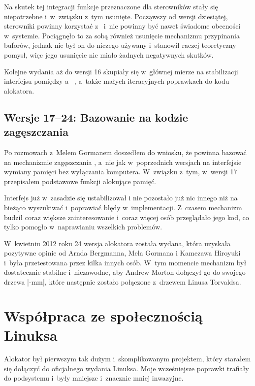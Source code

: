 Na skutek tej integracji funkcje  przeznaczone dla sterowników
stały się niepotrzebne i~w~związku z~tym usunięte.  Począwszy od
wersji dziesiątej, sterowniki powinny korzystać z~  i~nie
powinny być nawet świadome obecności  w~systemie.  Pociągnęło to za
sobą również usunięcie mechanizmu przypinania buforów, jednak nie był
on do niczego używany i~stanowił raczej teoretyczny pomysł, więc jego
usunięcie nie miało żadnych negatywnych skutków.

Kolejne wydania  aż do wersji 16 skupiały się w~głównej mierze na
stabilizacji interfejsu pomiędzy  a~ , a~także małych
iteracyjnych poprawkach do kodu alokatora.

\subsection{Wersje 17--24: Bazowanie na kodzie zagęszczania}

Po rozmowach z~Melem Gormanem doszedłem do wniosku, że  powinna
bazować na mechanizmie zagęszczania \autocite{bib:compaction,
  bib:supporting-large-contig-regions}, a~nie jak w~poprzednich
wersjach na interfejsie wymiany pamięci  bez wyłączania komputera.
W~związku z~tym, w~wersji 17 przepisałem podstawowe funkcji alokujące
pamięć.

Interfejs  już w~zasadzie się ustabilizował i nie pozostało już nic
innego niż na bieżąco wyszukiwać i~poprawiać błędy w~implementacji.
Z~czasem mechanizm  budził coraz większe zainteresowanie i~coraz
więcej osób przeglądało jego kod, co tylko pomogło w~naprawianiu
wszelkich problemów.

W~kwietniu 2012 roku 24 wersja alokatora  została wydana, która
uzyskała pozytywne opinie od Arnda Bergmanna, Mela Gormana i Kamezawa
Hiroyuki i~była przetestowana przez kilka innych osób.  W~tym momencie
mechanizm  był dostatecznie stabilne i~niezawodne, aby Andrew
Morton dołączył go do swojego drzewa \code|-mm|, które następnie
zostało połączone z~drzewem Linusa Torvaldsa.

\section{Współpraca ze społecznością Linuksa}

Alokator  był pierwszym tak dużym i~skomplikowanym projektem, który
starałem się dołączyć do oficjalnego wydania Linuksa.  Moje
wcześniejsze poprawki trafiały do podsystemu  i~były mniejsze
i~znacznie mniej inwazyjne.

